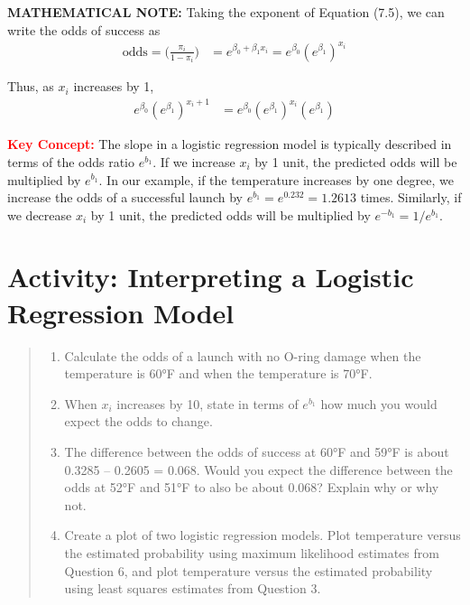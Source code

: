 \documentclass[
]{report}
\providecommand{\tightlist}{%
  \setlength{\itemsep}{0pt}\setlength{\parskip}{0pt}}
\begin{document}
\large

\textbf{MATHEMATICAL NOTE:}
Taking the exponent of Equation (7.5), we can write the odds of success as
\begin{align}
\text{odds} = \biggl(\frac{\pi_i}{1 - \pi_i}\biggr) &= e^{\beta_0 + \beta_1 x_i} = e^{\beta_0}(e^{\beta_1})^{x_i} \tag{7.11}
\end{align}

Thus, as \(x_i\) increases by 1,
\begin{align}
e^{\beta_0}(e^{\beta_1})^{x_i + 1} &= e^{\beta_0}(e^{\beta_1})^{x_i}(e^{\beta_1}) \tag{7.12}
\end{align}

\normalsize

\Large

\textbf{\textcolor{red}{Key Concept:}}
\color{red}
The slope in a logistic regression model is typically described in terms of the odds ratio \(e^{b_1}\). If we increase \(x_i\) by 1 unit, the predicted odds will be multiplied by \(e^{b_1}\). In our example, if the temperature increases by one degree, we increase the odds of a successful launch by \(e^{b_1} = e^{0.232} = 1.2613\) times. Similarly, if we decrease \(x_i\) by 1 unit, the predicted odds will be multiplied by \(e^{-b_1} = 1/e^{b_1}\).
\color{black}
\normalsize

\hypertarget{activity-interpreting-a-logistic-regression-model-1}{%
\section*{Activity: Interpreting a Logistic Regression Model}\label{activity-interpreting-a-logistic-regression-model-1}}

\begin{quote}
\begin{enumerate}
\def\labelenumi{\arabic{enumi}.}
\setcounter{enumi}{7}
\tightlist
\item
  Calculate the odds of a launch with no O-ring damage when the temperature is 60°F and when the temperature is 70°F.\\
\item
  When \(x_i\) increases by 10, state in terms of \(e^{b_1}\) how much you would expect the odds to change.\\
\item
  The difference between the odds of success at 60°F and 59°F is about 0.3285 -- 0.2605 = 0.068. Would you expect the difference between the odds at 52°F and 51°F to also be about 0.068? Explain why or why not.\\
\item
  Create a plot of two logistic regression models. Plot temperature versus the estimated probability using maximum likelihood estimates from Question 6, and plot temperature versus the estimated probability using least squares estimates from Question 3.
\end{enumerate}
\end{quote}
\end{document}
